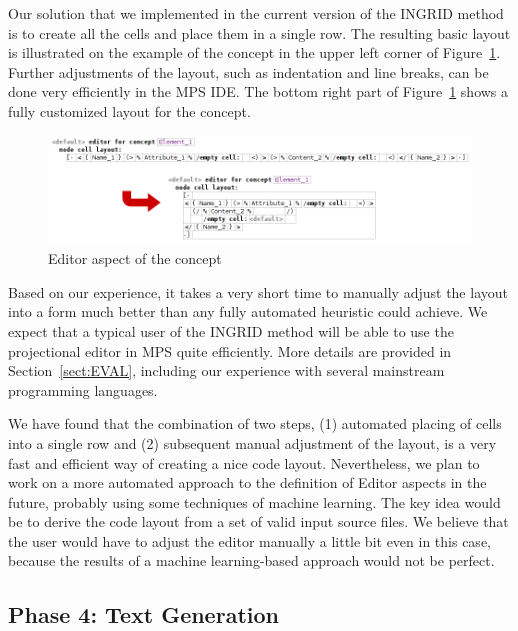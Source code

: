 Our solution that we implemented in the current version of the INGRID method is to create all the cells and place them in a single row.
The resulting basic layout is illustrated on the example of the  concept in the upper left corner of Figure~\ref{fig:EDITORADJUST}.
Further adjustments of the layout, such as indentation and line breaks, can be done very efficiently in the MPS IDE.
The bottom right part of Figure~\ref{fig:EDITORADJUST} shows a fully customized layout for the  concept.

\begin{figure}[ht]
	\centering
	\includegraphics[scale=0.55]{./images/editor_adjustment.png}
	\caption{Editor aspect of the  concept}
	\label{fig:EDITORADJUST}
\end{figure}

Based on our experience, it takes a very short time to manually adjust the layout into a form much better than any fully automated heuristic could achieve.
We expect that a typical user of the INGRID method will be able to use the projectional editor in MPS quite efficiently.
More details are provided in Section~\ref{sect:EVAL}, including our experience with several mainstream programming languages.

We have found that the combination of two steps, (1) automated placing of cells into a single row and (2) subsequent manual adjustment of the layout, is a very fast and efficient way of creating a nice code layout.
Nevertheless, we plan to work on a more automated approach to the definition of Editor aspects in the future, probably using some techniques of machine learning.
The key idea would be to derive the code layout from a set of valid input source files.
We believe that the user would have to adjust the editor manually a little bit even in this case, because the results of a machine learning-based approach would not be perfect.

\subsection{Phase 4: Text Generation}

